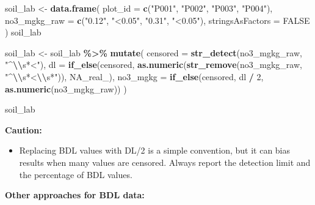 \documentclass[
  10pt,
  b5paper,
  oneside]{book}
\newenvironment{Shaded}{\begin{snugshade}}{\end{snugshade}}
\newcommand{\AttributeTok}[1]{\textcolor[rgb]{0.13,0.29,0.53}{#1}}
\newcommand{\ConstantTok}[1]{\textcolor[rgb]{0.56,0.35,0.01}{#1}}
\newcommand{\DecValTok}[1]{\textcolor[rgb]{0.00,0.00,0.81}{#1}}
\newcommand{\FunctionTok}[1]{\textcolor[rgb]{0.13,0.29,0.53}{\textbf{#1}}}
\newcommand{\NormalTok}[1]{#1}
\newcommand{\OtherTok}[1]{\textcolor[rgb]{0.56,0.35,0.01}{#1}}
\newcommand{\SpecialCharTok}[1]{\textcolor[rgb]{0.81,0.36,0.00}{\textbf{#1}}}
\newcommand{\StringTok}[1]{\textcolor[rgb]{0.31,0.60,0.02}{#1}}
\providecommand{\tightlist}{%
  \setlength{\itemsep}{0pt}\setlength{\parskip}{0pt}}
\begin{document}
\begin{Shaded}
\begin{Highlighting}[]
\NormalTok{soil\_lab }\OtherTok{\textless{}{-}} \FunctionTok{data.frame}\NormalTok{(}
  \AttributeTok{plot\_id =} \FunctionTok{c}\NormalTok{(}\StringTok{"P001"}\NormalTok{, }\StringTok{"P002"}\NormalTok{, }\StringTok{"P003"}\NormalTok{, }\StringTok{"P004"}\NormalTok{),}
  \AttributeTok{no3\_mgkg\_raw =} \FunctionTok{c}\NormalTok{(}\StringTok{"0.12"}\NormalTok{, }\StringTok{"\textless{}0.05"}\NormalTok{, }\StringTok{"0.31"}\NormalTok{, }\StringTok{"\textless{}0.05"}\NormalTok{),}
  \AttributeTok{stringsAsFactors =} \ConstantTok{FALSE}
\NormalTok{)}
\NormalTok{soil\_lab}

\NormalTok{soil\_lab }\OtherTok{\textless{}{-}}\NormalTok{ soil\_lab }\SpecialCharTok{\%\textgreater{}\%}
  \FunctionTok{mutate}\NormalTok{(}
    \AttributeTok{censored =} \FunctionTok{str\_detect}\NormalTok{(no3\_mgkg\_raw, }\StringTok{"\^{}}\SpecialCharTok{\textbackslash{}\textbackslash{}}\StringTok{s*\textless{}"}\NormalTok{),}
    \AttributeTok{dl =} \FunctionTok{if\_else}\NormalTok{(censored,}
                 \FunctionTok{as.numeric}\NormalTok{(}\FunctionTok{str\_remove}\NormalTok{(no3\_mgkg\_raw, }\StringTok{"\^{}}\SpecialCharTok{\textbackslash{}\textbackslash{}}\StringTok{s*\textless{}}\SpecialCharTok{\textbackslash{}\textbackslash{}}\StringTok{s*"}\NormalTok{)),}
                 \ConstantTok{NA\_real\_}\NormalTok{),}
    \AttributeTok{no3\_mgkg =} \FunctionTok{if\_else}\NormalTok{(censored, dl }\SpecialCharTok{/} \DecValTok{2}\NormalTok{, }\FunctionTok{as.numeric}\NormalTok{(no3\_mgkg\_raw))}
\NormalTok{  )}

\NormalTok{soil\_lab}
\end{Highlighting}
\end{Shaded}

\textbf{Caution:}

\begin{itemize}
\tightlist
\item
  Replacing BDL values with DL/2 is a simple convention, but it can bias results when many values are censored. Always report the detection limit and the percentage of BDL values.
\end{itemize}

\textbf{Other approaches for BDL data:}
\end{document}

